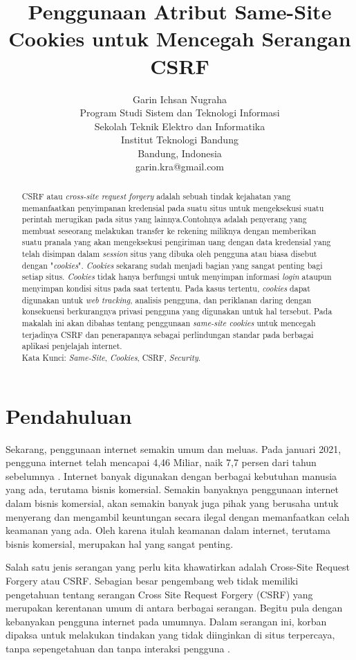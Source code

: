 \documentclass{article}
\title{Penggunaan Atribut Same-Site Cookies untuk Mencegah Serangan CSRF}
\author{Garin Ichsan Nugraha\\
Program Studi Sistem dan Teknologi Informasi\\
Sekolah Teknik Elektro dan Informatika\\
Institut Teknologi Bandung\\
Bandung, Indonesia\\
garin.kra@gmail.com}
\begin{document}
\begin{onehalfspacing}
\maketitle

\begin{abstract}
CSRF atau \textit{cross-site request forgery} adalah sebuah tindak kejahatan yang memanfaatkan penyimpanan kredensial pada suatu situs untuk mengeksekusi suatu perintah merugikan pada situs yang lainnya.Contohnya adalah penyerang yang membuat seseorang melakukan transfer ke rekening miliknya dengan memberikan suatu pranala yang akan mengeksekusi pengiriman uang dengan data kredensial yang telah disimpan dalam \textit{session} situs yang dibuka oleh pengguna atau biasa disebut dengan "\textit{cookies}". \textit{Cookies} sekarang sudah menjadi bagian yang sangat penting bagi setiap situs. \textit{Cookies} tidak hanya berfungsi untuk menyimpan informasi \textit{login} ataupun menyimpan kondisi situs pada saat tertentu. Pada kasus tertentu, \textit{cookies} dapat digunakan untuk \textit{web tracking}, analisis pengguna, dan periklanan daring dengan konsekuensi berkurangnya privasi pengguna yang digunakan untuk hal tersebut. Pada makalah ini akan dibahas tentang penggunaan \textit{same-site cookies} untuk mencegah terjadinya CSRF dan penerapannya sebagai perlindungan standar pada berbagai aplikasi penjelajah internet. \\

Kata Kunci: \textit{Same-Site}, \textit{Cookies}, CSRF, \textit{Security}.
\end{abstract}
\end{onehalfspacing}

\section{Pendahuluan}
Sekarang, penggunaan internet semakin umum dan meluas. Pada januari 2021, pengguna internet telah mencapai 4,46 Miliar, naik 7,7 persen dari tahun sebelumnya \cite{kemp_2021}. Internet banyak digunakan dengan berbagai kebutuhan manusia yang ada, terutama bisnis komersial. Semakin banyaknya penggunaan internet dalam bisnis komersial, akan semakin banyak juga pihak yang berusaha untuk menyerang dan mengambil keuntungan secara ilegal dengan memanfaatkan celah keamanan yang ada. Oleh karena itulah keamanan dalam internet, terutama bisnis komersial, merupakan hal yang sangat penting. 

Salah satu jenis serangan yang perlu kita khawatirkan adalah Cross-Site Request Forgery atau CSRF. Sebagian besar pengembang web tidak memiliki pengetahuan tentang serangan Cross Site Request Forgery (CSRF) yang merupakan kerentanan umum di antara berbagai serangan. Begitu pula dengan kebanyakan pengguna internet pada umumnya. Dalam serangan ini, korban dipaksa untuk melakukan tindakan yang tidak diinginkan di situs terpercaya, tanpa sepengetahuan dan tanpa interaksi pengguna \cite{sentamilselvan2013survey}. 
\end{document}
